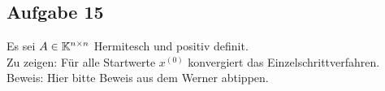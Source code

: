 \subsection*{Aufgabe 15}
Es sei $A \in \mathbb K^{n\times n}$ Hermitesch und positiv definit.\\
Zu zeigen: Für alle Startwerte $x^{(0)}$ konvergiert das Einzelschrittverfahren.\\
Beweis: Hier bitte Beweis aus dem Werner abtippen.